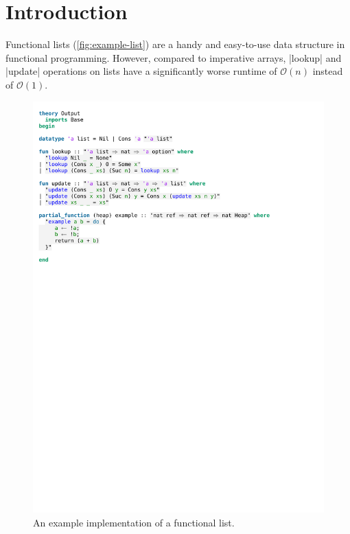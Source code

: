 \chapter{Introduction}\label{chapter:introduction}

Functional lists (\autoref{fig:example-list}) are a handy and easy-to-use data structure in functional programming. However, compared to imperative arrays, |lookup| and |update| operations on lists have a significantly worse runtime of $\mathcal{O}(n)$ instead of $\mathcal{O}(1)$. 

\begin{figure}[htpb]
\includegraphics[trim={0 22,2cm 0 2,3cm},clip, width=1.00\textwidth]{figures/Theory_Intro.pdf}
\caption[Example functional list implementation]{An example implementation of a functional list.}\label{fig:example-list}
\end{figure}

